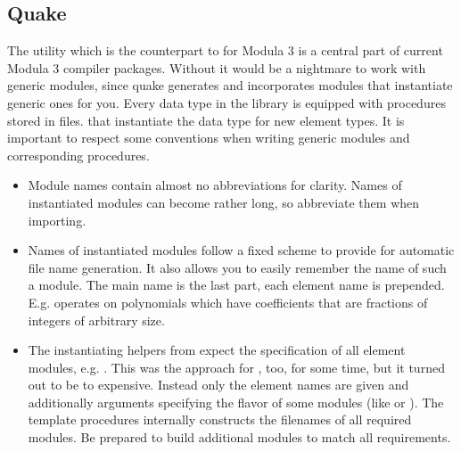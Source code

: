 \subsection{Quake}

The  utility which is the counterpart
to  for Modula 3
is a central part of current Modula 3 compiler packages.
Without  it would be a nightmare
to work with generic modules,
since quake generates and incorporates
modules that instantiate generic ones for you.
Every data type in the \modna{} library
is equipped with  procedures
stored in  files.
that instantiate the data type for new element types.
It is important to respect some conventions
when writing generic modules and
corresponding  procedures.
\begin{itemize}
\item Module names contain almost no abbreviations for clarity.
Names of instantiated modules can become rather long, so abbreviate them when importing.
\item Names of instantiated modules follow a fixed scheme
to provide for automatic file name generation.
It also allows you to easily remember the name of such a module.
The main name is the last part, each element name is prepended.
E.g. 
operates on polynomials which have coefficients
that are fractions of integers of arbitrary size.
\item The instantiating helpers from 
expect the specification of all element modules,
e.g. .
This was the approach for \modna{}, too, for some time,
but it turned out to be to expensive.
Instead only the element names are given
and additionally arguments specifying the flavor
of some modules (like  or ).
The  template procedures
internally constructs the filenames of all required modules.
Be prepared to build additional modules
to match all requirements.


\end{itemize}
